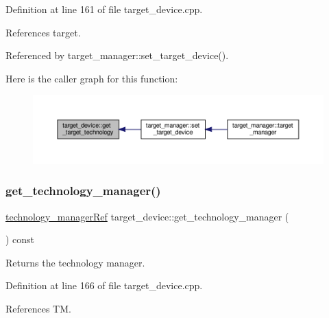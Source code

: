 Definition at line 161 of file target\+\_\+device.\+cpp.



References target.



Referenced by target\+\_\+manager\+::set\+\_\+target\+\_\+device().

Here is the caller graph for this function\+:
\nopagebreak
\begin{figure}[H]
\begin{center}
\leavevmode
\includegraphics[width=350pt]{d9/dd8/classtarget__device_afe3565642b50b7a6be23f7521c4d966e_icgraph}
\end{center}
\end{figure}
\mbox{\label{classtarget__device_a66e29854522d999a5ab9b8f74baeebff}} 
\subsubsection{\texorpdfstring{get\+\_\+technology\+\_\+manager()}{get\_technology\_manager()}}
{\footnotesize\ttfamily \hyperlink{technology__manager_8hpp_a4b9ecd440c804109c962654f9227244e}{technology\+\_\+manager\+Ref} target\+\_\+device\+::get\+\_\+technology\+\_\+manager (\begin{DoxyParamCaption}{ }\end{DoxyParamCaption}) const}



Returns the technology manager. 



Definition at line 166 of file target\+\_\+device.\+cpp.



References TM.

\mbox{\label{classtarget__device_ad99d9910849ae26b259a7c8d67f8aa5e}} 
